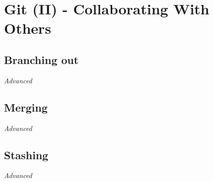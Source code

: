 \chapter{Git (II) - Collaborating With Others}

\section{Branching out}

\textit{Advanced}
\vspace{6mm}

\section{Merging}

\textit{Advanced}
\vspace{6mm}

\section{Stashing}

\textit{Advanced}
\vspace{6mm}

